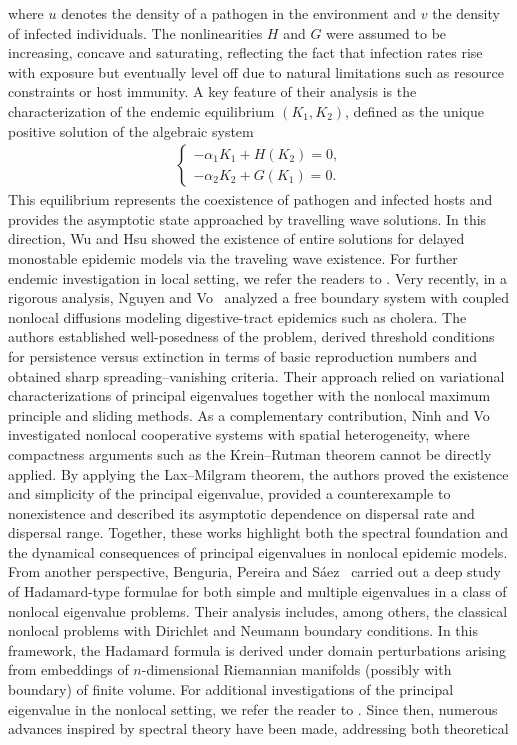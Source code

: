 \documentclass[a4paper,11pt]{amsart}
\theoremstyle{definition}
\numberwithin{equation}{section}
\theoremstyle{definition}
\begin{document}
 where $u$ denotes the density of a pathogen in the environment and $v$ the density of infected individuals. The nonlinearities $H$ and $G$ were assumed to be increasing, concave and saturating, reflecting the fact that infection rates rise with exposure but eventually level off due to natural limitations such as resource constraints or host immunity. A key feature of their analysis is the characterization of the endemic equilibrium $(K_1, K_2)$, defined as the unique positive solution of the algebraic system  
\begin{align*}
\left\{\begin{array}{llll}
-\alpha_1 K_1 + H(K_2) = 0, \\[6pt]
-\alpha_2 K_2 + G(K_1) = 0.
\end{array}\right.
\end{align*}
This equilibrium represents the coexistence of pathogen and infected hosts and provides the asymptotic state approached by travelling wave solutions. In this direction, Wu and Hsu \cite{wu_hsu_2016} showed the existence of entire solutions for delayed monostable epidemic models via the traveling wave existence. For further endemic investigation in local setting, we refer the readers to \cite{allen_asymptotic_2008,ge_sis_2015}. Very recently, in a rigorous analysis, Nguyen and Vo~\cite{nguyen_dynamics_2022} analyzed a free boundary system with coupled nonlocal diffusions modeling digestive-tract epidemics such as cholera. The authors established well-posedness of the problem, derived threshold conditions for persistence versus extinction in terms of basic reproduction numbers and obtained sharp spreading–vanishing criteria. Their approach relied on variational characterizations of principal eigenvalues together with the nonlocal maximum principle and sliding methods. As a complementary contribution, Ninh and Vo~\cite{ninh_vo_asymptotic_2025} investigated nonlocal cooperative systems with spatial heterogeneity, where compactness arguments such as the Krein–Rutman theorem cannot be directly applied. By applying the Lax–Milgram theorem, the authors proved the existence and simplicity of the principal eigenvalue, provided a counterexample to nonexistence and described its asymptotic dependence on dispersal rate and dispersal range. Together, these works highlight both the spectral foundation and the dynamical consequences of principal eigenvalues in nonlocal epidemic models. From another perspective, Benguria, Pereira and Sáez~\cite{benguria_hadamard_2024} carried out a deep study of Hadamard-type formulae for both simple and multiple eigenvalues in a class of nonlocal eigenvalue problems. Their analysis includes, among others, the classical nonlocal problems with Dirichlet and Neumann boundary conditions. In this framework, the Hadamard formula is derived under domain perturbations arising from embeddings of $n$-dimensional Riemannian manifolds (possibly with boundary) of finite volume. For additional investigations of the principal eigenvalue in the nonlocal setting, we refer the reader to \cite{vo_timeperiodic_neumann,shen_vo_2019,coville_simple_2010,bao_shen_2017,feng_principal_2024,wu_principal_2025}. Since then, numerous advances inspired by spectral theory have been made, addressing both theoretical 
\end{document}
